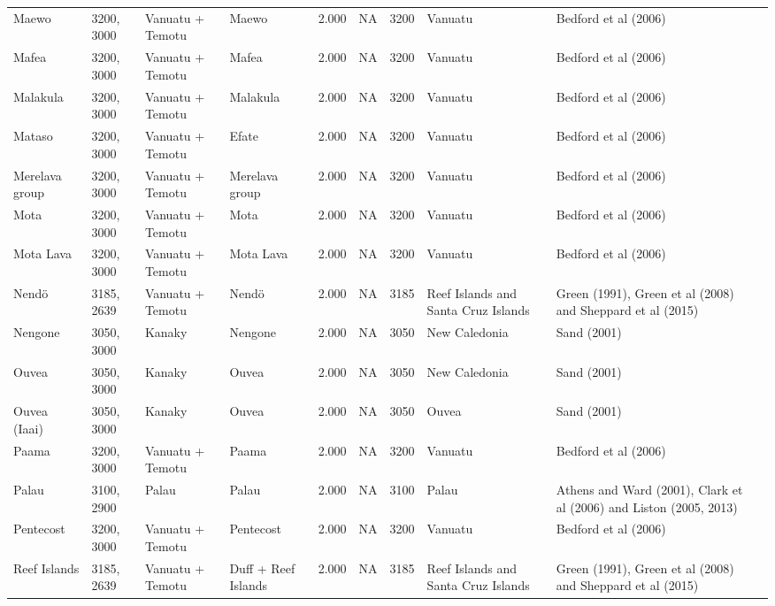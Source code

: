 \begin{longtable}{p{4.5cm}p{2cm}p{2cm}p{2cm}p{4cm}p{4cm}p{4cm}p{4cm}p{4cm}p{4cm}}
  Maewo & 3200, 3000 & Vanuatu + Temotu & Maewo & 2.000 & NA & 3200 & Vanuatu & Bedford et al (2006) & \citet{rieth_cochrane_2018} \\ 
  Mafea & 3200, 3000 & Vanuatu + Temotu & Mafea & 2.000 & NA & 3200 & Vanuatu & Bedford et al (2006) & \citet{rieth_cochrane_2018} \\ 
  Malakula & 3200, 3000 & Vanuatu + Temotu & Malakula & 2.000 & NA & 3200 & Vanuatu & Bedford et al (2006) & \citet{rieth_cochrane_2018} \\ 
  Mataso & 3200, 3000 & Vanuatu + Temotu & Efate & 2.000 & NA & 3200 & Vanuatu & Bedford et al (2006) & \citet{rieth_cochrane_2018} \\ 
  Merelava group & 3200, 3000 & Vanuatu + Temotu & Merelava group & 2.000 & NA & 3200 & Vanuatu & Bedford et al (2006) & \citet{rieth_cochrane_2018} \\ 
  Mota & 3200, 3000 & Vanuatu + Temotu & Mota & 2.000 & NA & 3200 & Vanuatu & Bedford et al (2006) & \citet{rieth_cochrane_2018} \\ 
  Mota Lava & 3200, 3000 & Vanuatu + Temotu & Mota Lava & 2.000 & NA & 3200 & Vanuatu & Bedford et al (2006) & \citet{rieth_cochrane_2018} \\ 
  Nendö & 3185, 2639 & Vanuatu + Temotu & Nendö & 2.000 & NA & 3185 & Reef Islands and Santa Cruz Islands & Green (1991), Green et al (2008) and Sheppard et al (2015) & \citet{rieth_cochrane_2018} \\ 
  Nengone & 3050, 3000 & Kanaky & Nengone & 2.000 & NA & 3050 & New Caledonia & Sand (2001) & \citet{rieth_cochrane_2018} \\ 
  Ouvea & 3050, 3000 & Kanaky & Ouvea & 2.000 & NA & 3050 & New Caledonia & Sand (2001) & \citet{rieth_cochrane_2018} \\ 
  Ouvea (Iaai) & 3050, 3000 & Kanaky & Ouvea & 2.000 & NA & 3050 & Ouvea & Sand (2001) & \citet{rieth_cochrane_2018} \\ 
  Paama & 3200, 3000 & Vanuatu + Temotu & Paama & 2.000 & NA & 3200 & Vanuatu & Bedford et al (2006) & \citet{rieth_cochrane_2018} \\ 
  Palau & 3100, 2900 & Palau & Palau & 2.000 & NA & 3100 & Palau & Athens and Ward (2001), Clark et al (2006) and Liston (2005, 2013) & \citet{rieth_cochrane_2018} \\ 
  Pentecost & 3200, 3000 & Vanuatu + Temotu & Pentecost & 2.000 & NA & 3200 & Vanuatu & Bedford et al (2006) & \citet{rieth_cochrane_2018} \\ 
  Reef Islands & 3185, 2639 & Vanuatu + Temotu & Duff + Reef Islands & 2.000 & NA & 3185 & Reef Islands and Santa Cruz Islands & Green (1991), Green et al (2008) and Sheppard et al (2015) & \citet{rieth_cochrane_2018} \\ 

\end{longtable}
